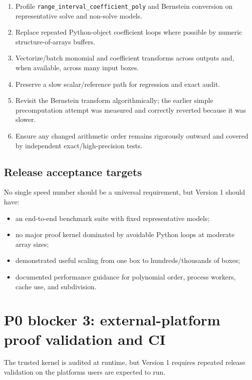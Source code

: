 \documentclass[11pt]{article}
\begin{document}
\begin{enumerate}[leftmargin=*]
\item Profile \texttt{range\_interval\_coefficient\_poly} and Bernstein conversion
on representative solve and non-solve models.
\item Replace repeated Python-object coefficient loops where possible by numeric
structure-of-arrays buffers.
\item Vectorize/batch monomial and coefficient transforms across outputs and, when
available, across many input boxes.
\item Preserve a slow scalar/reference path for regression and exact audit.
\item Revisit the Bernstein transform algorithmically; the earlier simple
precomputation attempt was measured and correctly reverted because it was slower.
\item Ensure any changed arithmetic order remains rigorously outward and covered
by independent exact/high-precision tests.
\end{enumerate}

\subsection{Release acceptance targets}

No single speed number should be a universal requirement, but Version 1 should
have:
\begin{itemize}[leftmargin=*]
\item an end-to-end benchmark suite with fixed representative models;
\item no major proof kernel dominated by avoidable Python loops at moderate array
sizes;
\item demonstrated useful scaling from one box to hundreds/thousands of boxes;
\item documented performance guidance for polynomial order, process workers,
cache use, and subdivision.
\end{itemize}

\section{P0 blocker 3: external-platform proof validation and CI}

The trusted kernel is audited at runtime, but Version 1 requires repeated release
validation on the platforms users are expected to run.
\end{document}
